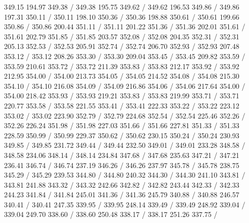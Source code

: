 { 349.15 194.97 349.38 /
 349.38 195.75 349.62 /
 349.62 196.53 349.86 /
 349.86 197.31 350.11 /
 350.11 198.10 350.36 /
 350.36 198.88 350.61 /
 350.61 199.66 350.86 /
 350.86 200.44 351.11 /
 351.11 201.22 351.36 /
 351.36 202.01 351.61 /
 351.61 202.79 351.85 /
 351.85 203.57 352.08 /
 352.08 204.35 352.31 /
 352.31 205.13 352.53 /
 352.53 205.91 352.74 /
 352.74 206.70 352.93 /
 352.93 207.48 353.12 /
 353.12 208.26 353.30 /
 353.30 209.04 353.45 /
 353.45 209.82 353.59 /
 353.59 210.61 353.72 /
 353.72 211.39 353.83 /
 353.83 212.17 353.92 /
 353.92 212.95 354.00 /
 354.00 213.73 354.05 /
 354.05 214.52 354.08 /
 354.08 215.30 354.10 /
 354.10 216.08 354.09 /
 354.09 216.86 354.06 /
 354.06 217.64 354.00 /
 354.00 218.42 353.93 /
 353.93 219.21 353.83 /
 353.83 219.99 353.71 /
 353.71 220.77 353.58 /
 353.58 221.55 353.41 /
 353.41 222.33 353.22 /
 353.22 223.12 353.02 /
 353.02 223.90 352.79 /
 352.79 224.68 352.54 /
 352.54 225.46 352.26 /
 352.26 226.24 351.98 /
 351.98 227.03 351.66 /
 351.66 227.81 351.33 /
 351.33 228.59 350.99 /
 350.99 229.37 350.62 /
 350.62 230.15 350.24 /
 350.24 230.93 349.85 /
 349.85 231.72 349.44 /
 349.44 232.50 349.01 /
 349.01 233.28 348.58 /
 348.58 234.06 348.14 /
 348.14 234.84 347.68 /
 347.68 235.63 347.21 /
 347.21 236.41 346.74 /
 346.74 237.19 346.26 /
 346.26 237.97 345.78 /
 345.78 238.75 345.29 /
 345.29 239.53 344.80 /
 344.80 240.32 344.30 /
 344.30 241.10 343.81 /
 343.81 241.88 343.32 /
 343.32 242.66 342.82 /
 342.82 243.44 342.33 /
 342.33 244.23 341.84 /
 341.84 245.01 341.36 /
 341.36 245.79 340.88 /
 340.88 246.57 340.41 /
 340.41 247.35 339.95 /
 339.95 248.14 339.49 /
 339.49 248.92 339.04 /
 339.04 249.70 338.60 /
 338.60 250.48 338.17 /
 338.17 251.26 337.75 /
}
